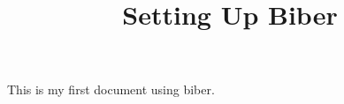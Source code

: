 \documentclass{article}
\title{Setting Up Biber}
\begin{document}
\maketitle

This is my first document using biber.
\autocite{Barneche2014}

\printbibliography
\end{document}
